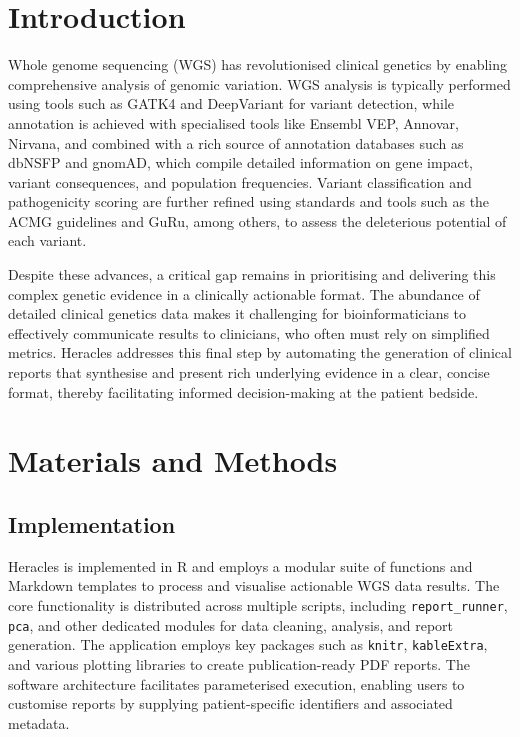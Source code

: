 \section{Introduction}
\noindent
Whole genome sequencing (WGS) has revolutionised clinical genetics by enabling comprehensive analysis of genomic variation. WGS analysis is typically performed using tools such as GATK4 and DeepVariant for variant detection, while annotation is achieved with specialised tools like Ensembl VEP, Annovar, Nirvana, and combined with a rich source of annotation databases such as dbNSFP and gnomAD, which compile detailed information on gene impact, variant consequences, and population frequencies. Variant classification and pathogenicity scoring are further refined using standards and tools such as the ACMG guidelines and GuRu, among others, to assess the deleterious potential of each variant.

Despite these advances, a critical gap remains in prioritising and delivering this complex genetic evidence in a clinically actionable format. The abundance of detailed clinical genetics data makes it challenging for bioinformaticians to effectively communicate results to clinicians, who often must rely on simplified metrics. Heracles addresses this final step by automating the generation of clinical reports that synthesise and present rich underlying evidence in a clear, concise format, thereby facilitating informed decision-making at the patient bedside.


\section{Materials and Methods}
\subsection{Implementation}
\noindent
Heracles is implemented in R and employs a modular suite of functions and Markdown templates to process and visualise actionable WGS data results. The core functionality is distributed across multiple scripts, including \texttt{report\_runner}, \texttt{pca}, and other dedicated modules for data cleaning, analysis, and report generation. The application employs key packages such as \texttt{knitr}, \texttt{kableExtra}, and various plotting libraries to create publication-ready PDF reports. The software architecture facilitates parameterised execution, enabling users to customise reports by supplying patient-specific identifiers and associated metadata.


